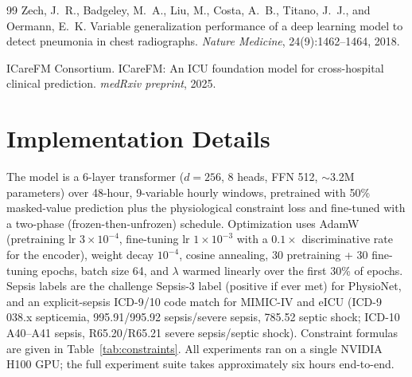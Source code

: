 \documentclass{article}
\begin{document}
{\begin{thebibliography}{99}
Zech, J.~R., Badgeley, M.~A., Liu, M., Costa, A.~B., Titano, J.~J., and Oermann, E.~K.
\newblock Variable generalization performance of a deep learning model to detect pneumonia in chest radiographs.
\newblock \emph{Nature Medicine}, 24(9):1462--1464, 2018.

ICareFM Consortium.
\newblock ICareFM: An ICU foundation model for cross-hospital clinical prediction.
\newblock \emph{medRxiv preprint}, 2025.

\end{thebibliography}
}

\appendix

\section{Implementation Details}
\label{app:implementation}

The model is a 6-layer transformer ($d{=}256$, 8 heads, FFN 512, $\sim$3.2M parameters) over 48-hour, 9-variable hourly windows, pretrained with 50\% masked-value prediction plus the physiological constraint loss and fine-tuned with a two-phase (frozen-then-unfrozen) schedule. Optimization uses AdamW (pretraining lr $3{\times}10^{-4}$, fine-tuning lr $1{\times}10^{-3}$ with a $0.1{\times}$ discriminative rate for the encoder), weight decay $10^{-4}$, cosine annealing, 30 pretraining + 30 fine-tuning epochs, batch size 64, and $\lambda$ warmed linearly over the first 30\% of epochs. Sepsis labels are the challenge Sepsis-3 label (positive if ever met) for PhysioNet, and an explicit-sepsis ICD-9/10 code match for MIMIC-IV and eICU (ICD-9 038.x septicemia, 995.91/995.92 sepsis/severe sepsis, 785.52 septic shock; ICD-10 A40--A41 sepsis, R65.20/R65.21 severe sepsis/septic shock). Constraint formulas are given in Table~\ref{tab:constraints}. All experiments ran on a single NVIDIA H100 GPU; the full experiment suite takes approximately six hours end-to-end.
\end{document}
